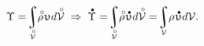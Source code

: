 \begin{otherlanguage}{russian}
\nopagebreak\vspace{-0.1em}\begin{equation}\label{rateofvolumeintegralchange}
\Upsilon = \hspace{-0.4ex} \scalebox{0.9}{$\displaystyle\integral\displaylimits_{\mathcircabove{\mathcal{V}}}$} \hspace{-0.1ex} \mathcircabove{\rho} \hspace{.19ex} \upupsilon \hspace{.11ex} d\mathcircabove{\mathcal{V}}
\;\Rightarrow\;
\mathdotabove{\Upsilon}
= \hspace{-0.4ex} \scalebox{0.9}{$\displaystyle\integral\displaylimits_{\mathcircabove{\mathcal{V}}}$} \hspace{-0.1ex} \mathcircabove{\rho} \hspace{.19ex} \mathdotabove{\upupsilon} \hspace{.11ex} d\mathcircabove{\mathcal{V}}
= \hspace{-0.4ex} \scalebox{0.9}{$\displaystyle\integral\displaylimits_{\mathcal{V}}$} \hspace{-0.1ex} \rho \hspace{.19ex} \mathdotabove{\upupsilon} \hspace{.11ex} d\mathcal{V} .
\end{equation}


\end{otherlanguage}
